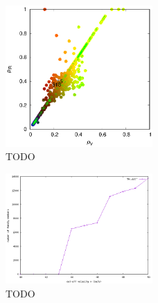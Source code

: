 \documentclass[A4paper, 12pt, oneside]{book}
\begin{document}
\begin{figure}
	\centering
	\includegraphics[width=0.5\textwidth]{obr/pV_pIR}
	\caption{TODO}
	\label{pV_pIR}
\end{figure}
\begin{figure}
	\centering
	\includegraphics[width=0.5\textwidth]{obr/Nv}
	\caption{TODO}
	\label{Nv}
\end{figure}
\end{document}
